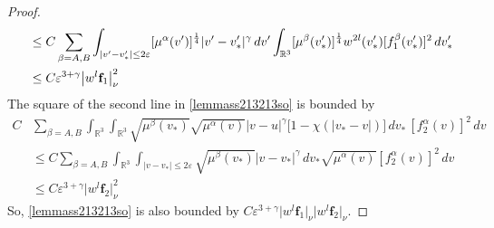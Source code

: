 \documentclass[reqno]{amsart}
\numberwithin{equation}{section}
\numberwithin{equation}{section}
\begin{document}
\begin{proof}
\begin{align*}
				&\hspace{0.3cm}\leq C \sum_{\beta=A,B} \int_{|v' - v_*'| \leq 2\varepsilon} [\mu^{\alpha}(v')]^{\frac{1}{4}} |v' - v_*'|^\gamma \,dv' \int_{\mathbb{R}^3} [\mu^\beta(v'_*)]^{\frac{1}{4}}w^{2l}(v'_*) [f^{\beta}_1(v_*')]^2 \,dv_*' \\
				&\hspace{0.3cm}\leq C\varepsilon^{3+\gamma} \big|w^{l} \mathbf{f}_1\big|_\nu^2
		\end{align*}
		The square of the second line in \eqref{lemmass213213so} is bounded by
		\begin{align*}
			C &\sum_{\beta=A,B}\int_{\mathbb{R}^3} \int_{\mathbb{R}^3}\sqrt{\mu^\beta(v_*)}\sqrt{\mu^{\alpha}(v)} |v - u|^\gamma \big[1 - \chi(|v_* - v|)\big] \,dv_*\,[f^\alpha_2(v)]^2\,dv \\
			&\leq C \sum_{\beta=A,B} \int_{\mathbb{R}^3} \int_{|v - v_*| \leq 2\varepsilon} \sqrt{\mu^\beta(v_*)} |v - v_*|^\gamma \,dv_*  \sqrt{\mu^{\alpha}(v)} [f^\alpha_2(v)]^2 \,dv \\
			&\leq C \varepsilon^{3+\gamma} \big|w^{l} \mathbf{f}_2\big|_\nu^2
		\end{align*}
		So, \eqref{lemmass213213so} is also bounded by $C\varepsilon^{3+\gamma} \big|w^{l} \mathbf{f}_1\big|_\nu \big|w^{l} \mathbf{f}_2\big|_\nu$.
		

\end{proof}
\end{document}
